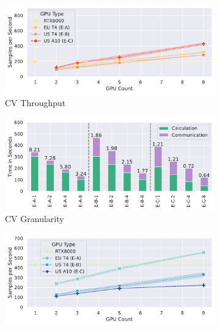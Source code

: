 \begin{figure}
    \begin{subfigure}[c]{0.24\textwidth}
        \includegraphics[width=\textwidth]{figures/misc/cv-private-setting-performance}
        \vspace{-15pt}
        \caption{CV Throughput}
        \label{fig:cv-private-hybrid-cloud-throughput}
    \end{subfigure}
    \begin{subfigure}[c]{0.21\textwidth}
        \includegraphics[width=\textwidth]{figures/misc/cv-private-cloud-performance-granularity}  
        \caption{CV Granularity}
        \label{fig:cv-private-hybrid-cloud-granularity}
    \end{subfigure}
        \begin{subfigure}[c]{0.24\textwidth}
        \includegraphics[width=\textwidth]{figures/misc/nlp-private-setting-performance}

\end{subfigure}
\end{figure}
